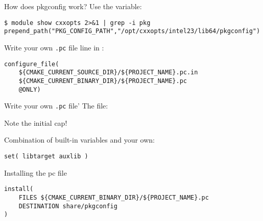 
\lstset{language=bash}


\begin{numberedframe}{How does pkgconfig work?}
Use the  variable:
\begin{lstlisting}
$ module show cxxopts 2>&1 | grep -i pkg
prepend_path("PKG_CONFIG_PATH","/opt/cxxopts/intel23/lib64/pkgconfig")
\end{lstlisting}
\end{numberedframe}

\begin{numberedframe}{Write your own \texttt{.pc} file}
 line in :
\begin{lstlisting}
configure_file(
    ${CMAKE_CURRENT_SOURCE_DIR}/${PROJECT_NAME}.pc.in
    ${CMAKE_CURRENT_BINARY_DIR}/${PROJECT_NAME}.pc
    @ONLY)
\end{lstlisting}
\end{numberedframe}

\begin{numberedframe}{Write your own \texttt{.pc} file'}
The  file:

Note the initial cap!

Combination of built-in variables and your own:
\begin{lstlisting}
set( libtarget auxlib )
\end{lstlisting}
\end{numberedframe}

\begin{numberedframe}{Installing the pc file}
\begin{lstlisting}
install(
    FILES ${CMAKE_CURRENT_BINARY_DIR}/${PROJECT_NAME}.pc
    DESTINATION share/pkgconfig
)
\end{lstlisting}
\end{numberedframe}
